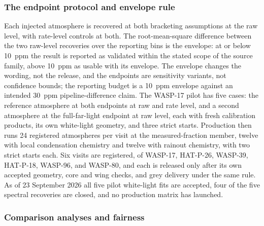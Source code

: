 \subsubsection{The endpoint protocol and envelope rule}


Each injected atmosphere is recovered at both bracketing assumptions at
the raw level, with rate-level controls at both. The root-mean-square
difference between the two raw-level recoveries over the reporting bins
is the envelope: at or below 10~ppm the result is reported as validated
within the stated scope of the source family, above 10~ppm as usable
with its envelope. The envelope changes the wording, not the release,
and the endpoints are sensitivity variants, not confidence bounds; the
reporting budget is a 10~ppm envelope against an intended 30~ppm
pipeline-difference claim. The WASP-17 pilot has five cases: the
reference atmosphere at both endpoints at raw and rate level, and a
second atmosphere at the full-far-light endpoint at raw level, each with
fresh calibration products, its own white-light geometry, and three
strict starts. Production then runs 24 registered atmospheres per visit
at the measured-fraction member, twelve with local condensation
chemistry and twelve with rainout chemistry, with two strict starts
each. Six visits are registered, of WASP-17, HAT-P-26, WASP-39,
HAT-P-18, WASP-96, and WASP-80, and each is released only after its own
accepted geometry, core and wing checks, and grey delivery under the same
rule. As of 23 September 2026 all five pilot white-light fits are
accepted, four of the five spectral recoveries are closed, and no
production matrix has launched.

\subsubsection{Comparison analyses and fairness}


